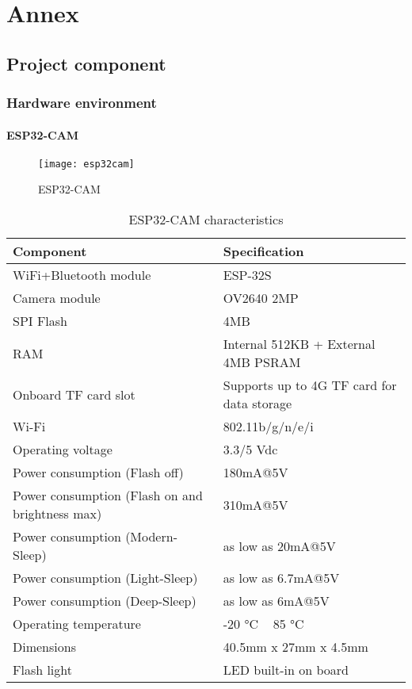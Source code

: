

%
%
\chapter{Annex}
\section{Project component}
\subsection{Hardware environment}
\subsubsection{ESP32-CAM}
\FloatBarrier
\begin{figure}[h]
         \centering
        \texttt{[image: esp32cam]}
   
        \caption{ESP32-CAM}
        \label{fig:esp32cam}
    \end{figure}
\FloatBarrier
\FloatBarrier
\begin{table}[h]
\centering
\begin{tabular}{|l|l|}
\hline
\textbf{Component} & \textbf{Specification} \\ \hline
WiFi+Bluetooth module & ESP-32S \\ \hline
Camera module & OV2640 2MP \\ \hline
SPI Flash & 4MB \\ \hline
RAM & Internal 512KB + External 4MB PSRAM \\ \hline
Onboard TF card slot & Supports up to 4G TF card for data storage \\ \hline
Wi-Fi & 802.11b/g/n/e/i \\ \hline
Operating voltage & 3.3/5 Vdc \\ \hline
Power consumption (Flash off) & 180mA@5V \\ \hline
Power consumption (Flash on and brightness max) & 310mA@5V \\ \hline
Power consumption (Modern-Sleep) & as low as 20mA@5V \\ \hline
Power consumption (Light-Sleep) & as low as 6.7mA@5V \\ \hline
Power consumption (Deep-Sleep) & as low as 6mA@5V \\ \hline
Operating temperature & -20 °C ~ 85 °C \\ \hline
Dimensions & 40.5mm x 27mm x 4.5mm \\ \hline
Flash light & LED built-in on board \\ \hline
\end{tabular}
\caption{ESP32-CAM characteristics \cite{HT}}
\label{table:esp32-cam-characteristics}
\end{table}
\FloatBarrier

